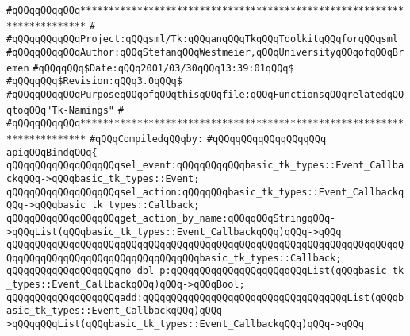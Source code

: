 \label{src/lib/tk/src/bind.api}
\verb|#qQQqqQQqqQQq***********************************************************************|\newline
\verb|#|\newline
\verb|#qQQqqQQqqQQqProject:qQQqsml/Tk:qQQqanqQQqTkqQQqToolkitqQQqforqQQqsml|\newline
\verb|#qQQqqQQqqQQqAuthor:qQQqStefanqQQqWestmeier,qQQqUniversityqQQqofqQQqBremen|\newline
\verb|#qQQqqQQq$Date:qQQq2001/03/30qQQq13:39:01qQQq$|\newline
\verb|#qQQqqQQq$Revision:qQQq3.0qQQq$|\newline
\verb|#qQQqqQQqqQQqPurposeqQQqofqQQqthisqQQqfile:qQQqFunctionsqQQqrelatedqQQqtoqQQq"Tk-Namings"|\newline
\verb|#|\newline
\verb|#qQQqqQQqqQQq***********************************************************************|\newline
\newline
\verb|#qQQqCompiledqQQqby:|\newline
\verb|#qQQqqQQqqQQqqQQqqQQq|\newline
\newline
\verb|apiqQQqBindqQQq{|\newline
\newline
\verb|qQQqqQQqqQQqqQQqqQQqsel_event:qQQqqQQqqQQqbasic_tk_types::Event_CallbackqQQq->qQQqbasic_tk_types::Event;|\newline
\verb|qQQqqQQqqQQqqQQqqQQqsel_action:qQQqqQQqbasic_tk_types::Event_CallbackqQQq->qQQqbasic_tk_types::Callback;|\newline
\newline
\verb|qQQqqQQqqQQqqQQqqQQqget_action_by_name:qQQqqQQqStringqQQq->qQQqList(qQQqbasic_tk_types::Event_CallbackqQQq)qQQq->qQQq|\newline
\verb|qQQqqQQqqQQqqQQqqQQqqQQqqQQqqQQqqQQqqQQqqQQqqQQqqQQqqQQqqQQqqQQqqQQqqQQqqQQqqQQqqQQqqQQqqQQqqQQqqQQqqQQqbasic_tk_types::Callback;|\newline
\newline
\verb|qQQqqQQqqQQqqQQqqQQqno_dbl_p:qQQqqQQqqQQqqQQqqQQqqQQqList(qQQqbasic_tk_types::Event_CallbackqQQq)qQQq->qQQqBool;|\newline
\newline
\verb|qQQqqQQqqQQqqQQqqQQqadd:qQQqqQQqqQQqqQQqqQQqqQQqqQQqqQQqqQQqList(qQQqbasic_tk_types::Event_CallbackqQQq)qQQq->qQQqqQQqList(qQQqbasic_tk_types::Event_CallbackqQQq)qQQq->qQQq|\newline
